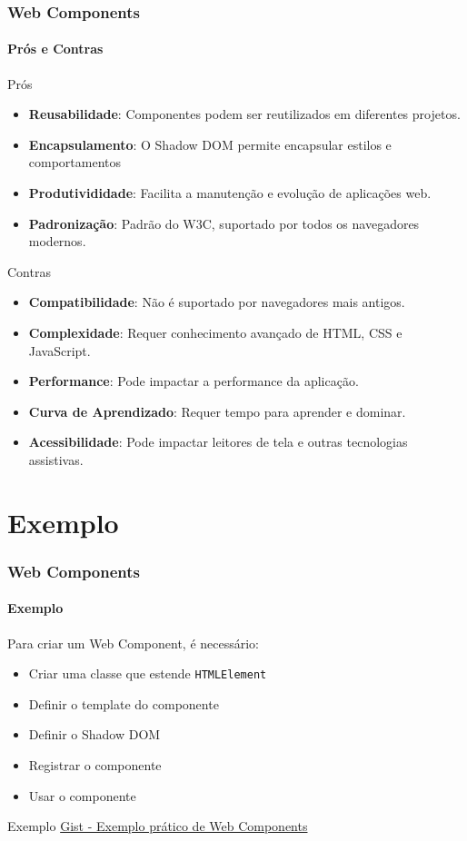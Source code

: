 \documentclass[
	9pt, %
	t, %
]{beamer}
\newcommand{\iconLink}[2]{\href{#1}{\faLink \hspace{0.2em} {#2}}}
\begin{document}
\begin{frame}
	\frametitle{Web Components}
	\framesubtitle{Prós e Contras}
	\begin{exampleblock}{Prós}
		\begin{itemize}
			\item \textbf{Reusabilidade}: Componentes podem ser reutilizados em diferentes projetos.
			\item \textbf{Encapsulamento}: O Shadow DOM permite encapsular estilos e comportamentos
			\item \textbf{Produtivididade}: Facilita a manutenção e evolução de aplicações web.
			\item \textbf{Padronização}: Padrão do W3C, suportado por todos os navegadores modernos.
		\end{itemize}
	\end{exampleblock}

	\begin{alertblock}{Contras}
		\begin{itemize}
			\item \textbf{Compatibilidade}: Não é suportado por navegadores mais antigos.
			\item \textbf{Complexidade}: Requer conhecimento avançado de HTML, CSS e JavaScript.
			\item \textbf{Performance}: Pode impactar a performance da aplicação.
			\item \textbf{Curva de Aprendizado}: Requer tempo para aprender e dominar.
			\item \textbf{Acessibilidade}: Pode impactar leitores de tela e outras tecnologias assistivas.
		\end{itemize}
	\end{alertblock}

\end{frame}

\section{Exemplo}

\begin{frame}
	\frametitle{Web Components}
	\framesubtitle{Exemplo}

	Para criar um Web Component, é necessário:
	\begin{itemize}
		\item Criar uma classe que estende \texttt{HTMLElement}
		\item Definir o template do componente
		\item Definir o Shadow DOM
		\item Registrar o componente
		\item Usar o componente
	\end{itemize}

	\begin{exampleblock}{Exemplo}
		\iconLink{https://gist.github.com/fabricioifc/36e978f4ff2add25ca0eed6e86219918}{Gist - Exemplo prático de Web Components}
	\end{exampleblock}

\end{frame}
\end{document}
